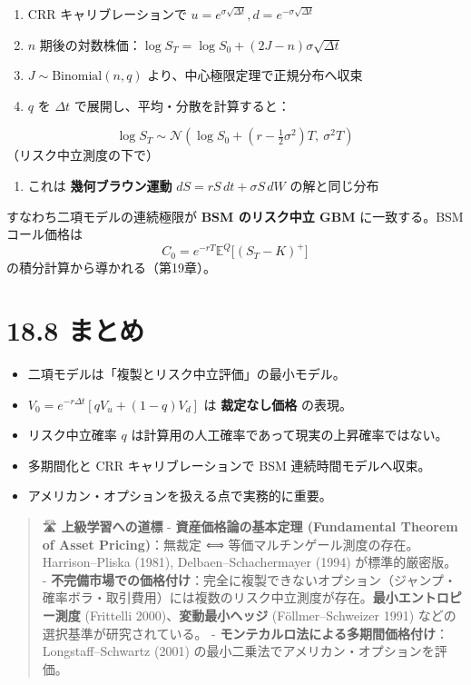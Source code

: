 \documentclass[11pt,a4paper]{report}
\begin{document}
\begin{enumerate}
\item CRR キャリブレーションで $u = e^{\sigma \sqrt{\Delta t}}, d = e^{-\sigma \sqrt{\Delta t}}$
\item $n$ 期後の対数株価：$\log S_T = \log S_0 + (2J - n)\sigma\sqrt{\Delta t}$
\item $J \sim \mathrm{Binomial}(n, q)$ より、中心極限定理で正規分布へ収束
\item $q$ を $\Delta t$ で展開し、平均・分散を計算すると：
\end{enumerate}
\[ \log S_T \sim \mathcal{N}\!\left(\log S_0 + (r - \tfrac{1}{2} \sigma^2) T,\ \sigma^2 T\right) \] （リスク中立測度の下で）
\begin{enumerate}
\item これは \textbf{幾何ブラウン運動} $dS = r S\, dt + \sigma S\, dW$ の解と同じ分布
\end{enumerate}

すなわち二項モデルの連続極限が \textbf{BSM のリスク中立 GBM} に一致する。BSM コール価格は \[ C_0 = e^{-rT} \mathbb{E}^Q\!\bigl[(S_T - K)^+\bigr] \] の積分計算から導かれる（第19章）。

\section{18.8 まとめ}

\begin{itemize}
\item 二項モデルは「複製とリスク中立評価」の最小モデル。
\item $V_0 = e^{-r\Delta t}[q V_u + (1-q) V_d]$ は \textbf{裁定なし価格} の表現。
\item リスク中立確率 $q$ は計算用の人工確率であって現実の上昇確率ではない。
\item 多期間化と CRR キャリブレーションで BSM 連続時間モデルへ収束。
\item アメリカン・オプションを扱える点で実務的に重要。
\end{itemize}

\begin{quote}
🛣 \textbf{上級学習への道標}
- \textbf{資産価格論の基本定理 (Fundamental Theorem of Asset Pricing)}：無裁定 ⟺ 等価マルチンゲール測度の存在。Harrison–Pliska (1981), Delbaen–Schachermayer (1994) が標準的厳密版。
- \textbf{不完備市場での価格付け}：完全に複製できないオプション（ジャンプ・確率ボラ・取引費用）には複数のリスク中立測度が存在。\textbf{最小エントロピー測度} (Frittelli 2000)、\textbf{変動最小ヘッジ} (Föllmer–Schweizer 1991) などの選択基準が研究されている。
- \textbf{モンテカルロ法による多期間価格付け}：Longstaff–Schwartz (2001) の最小二乗法でアメリカン・オプションを評価。
\end{quote}
\end{document}
